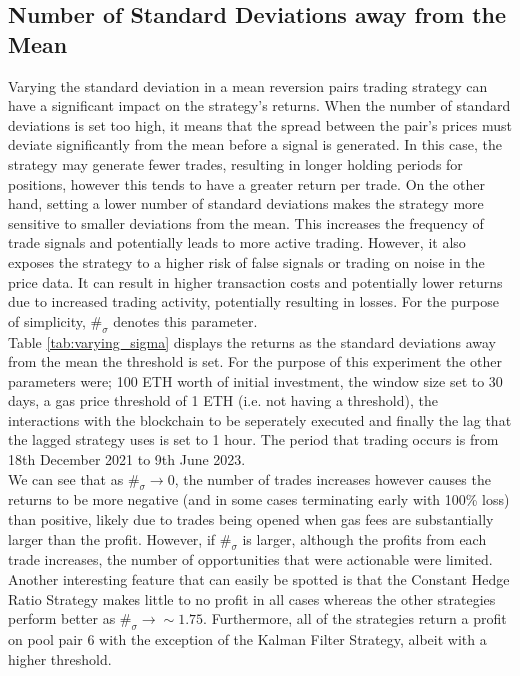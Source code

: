 \subsection{Number of Standard Deviations away from the Mean}
Varying the standard deviation in a mean reversion pairs trading strategy can have a significant impact on the strategy's returns. When the number of standard deviations is set too high, it means that the spread between the pair's prices must deviate significantly from the mean before a signal is generated. In this case, the strategy may generate fewer trades, resulting in longer holding periods for positions, however this tends to have a greater return per trade. On the other hand, setting a lower number of standard deviations makes the strategy more sensitive to smaller deviations from the mean. This increases the frequency of trade signals and potentially leads to more active trading. However, it also exposes the strategy to a higher risk of false signals or trading on noise in the price data. It can result in higher transaction costs and potentially lower returns due to increased trading activity, potentially resulting in losses. For the purpose of simplicity, $\#_{\sigma}$ denotes this parameter.
\\[3mm]
Table \ref{tab:varying_sigma} displays the returns as the standard deviations away from the mean the threshold is set. For the purpose of this experiment the other parameters were; 100 ETH worth of initial investment, the window size set to 30 days, a gas price threshold of 1 ETH (i.e. not having a threshold), the interactions with the blockchain to be seperately executed and finally the lag that the lagged strategy uses is set to 1 hour. The period that trading occurs is from 18th December 2021 to 9th June 2023.
\\[3mm]
We can see that as $\#_{\sigma} \rightarrow 0$, the number of trades increases however causes the returns to be more negative (and in some cases terminating early with 100\% loss) than positive, likely due to trades being opened when gas fees are substantially larger than the profit. However, if $\#_{\sigma}$ is larger, although the profits from each trade increases, the number of opportunities that were actionable were limited. Another interesting feature that can easily be spotted is that the Constant Hedge Ratio Strategy makes little to no profit in all cases whereas the other strategies perform better as $\#_{\sigma} \rightarrow \sim 1.75$. Furthermore, all of the strategies return a profit on pool pair 6 with the exception of the Kalman Filter Strategy, albeit with a higher threshold.
